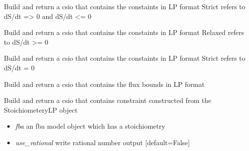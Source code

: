 \documentclass[a4paper,11pt,english]{sphinxmanual}
\begin{document}

\begin{fulllineitems}
\label{modules_doc:cbmpy.CBWrite.BuildLPConstraintsMath}
Build and return a csio that contains the constaints in LP format
Strict refers to dS/dt =\textgreater{} 0 and dS/dt \textless{}= 0

\end{fulllineitems}


\begin{fulllineitems}
\label{modules_doc:cbmpy.CBWrite.BuildLPConstraintsRelaxed}
Build and return a csio that contains the constaints in LP format
Relaxed refers to dS/dt \textgreater{}= 0

\end{fulllineitems}


\begin{fulllineitems}
\label{modules_doc:cbmpy.CBWrite.BuildLPConstraintsStrict}
Build and return a csio that contains the constaints in LP format
Strict refers to dS/dt = 0

\end{fulllineitems}


\begin{fulllineitems}
\label{modules_doc:cbmpy.CBWrite.BuildLPFluxBounds}
Build and return a csio that contains the flux bounds in LP format

\end{fulllineitems}


\begin{fulllineitems}
\label{modules_doc:cbmpy.CBWrite.BuildLPUserConstraints}
Build and return a csio that contains constraint constructed from
the StoichiometeryLP object
\begin{itemize}
\item {} 
\emph{fba} an fba model object which has a stoichiometry

\item {} 
\emph{use\_rational} write rational number output {[}default=False{]}

\end{itemize}

\end{fulllineitems}
\end{document}
